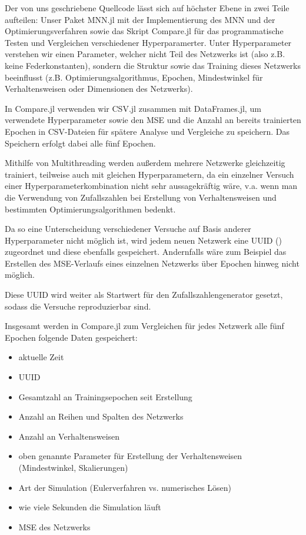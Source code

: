Der von uns geschriebene Quellcode lässt sich auf höchster Ebene in zwei Teile aufteilen: Unser Paket MNN.jl mit der Implementierung des MNN und der Optimierungsverfahren sowie das Skript Compare.jl für das programmatische Testen und Vergleichen verschiedener Hyperparamerter.
Unter Hyperparameter verstehen wir einen Parameter, welcher nicht Teil des Netzwerks ist (also z.B. keine Federkonstanten), sondern die Struktur sowie das Training dieses Netzwerks beeinflusst (z.B. Optimierungsalgorithmus, Epochen, Mindestwinkel für Verhaltensweisen oder Dimensionen des Netzwerks). 

In Compare.jl verwenden wir CSV.jl zusammen mit DataFrames.jl, um verwendete Hyperparameter sowie den MSE und die Anzahl an bereits trainierten Epochen in CSV-Dateien für spätere Analyse und Vergleiche zu speichern. 
Das Speichern erfolgt dabei alle fünf Epochen.

Mithilfe von Multithreading werden außerdem mehrere Netzwerke gleichzeitig trainiert, teilweise auch mit gleichen Hyperparametern, da ein einzelner Versuch einer Hyperparameterkombination nicht sehr aussagekräftig wäre, v.a. wenn man die Verwendung von Zufallszahlen bei Erstellung von Verhaltensweisen und bestimmten Optimierungsalgorithmen bedenkt.

Da so eine Unterscheidung verschiedener Versuche auf Basis anderer Hyperparameter nicht möglich ist, wird jedem neuen Netzwerk eine UUID ()
zugeordnet und diese ebenfalls gespeichert.
Andernfalls wäre zum Beispiel das Erstellen des MSE-Verlaufs eines einzelnen Netzwerks über Epochen hinweg nicht möglich.

Diese UUID wird weiter als Startwert für den Zufallszahlengenerator gesetzt, sodass die Versuche reproduzierbar sind.

Insgesamt werden in Compare.jl zum Vergleichen für jedes Netzwerk alle fünf Epochen folgende Daten gespeichert:

\begin{itemize}
    \item aktuelle Zeit
    \item UUID
    \item Gesamtzahl an Trainingsepochen seit Erstellung
    \item Anzahl an Reihen und Spalten des Netzwerks
    \item Anzahl an Verhaltensweisen
    \item oben genannte Parameter für Erstellung der Verhaltensweisen (Mindestwinkel, Skalierungen)
    \item Art der Simulation (Eulerverfahren vs. numerisches Lösen) %
    \item wie viele Sekunden die Simulation läuft
    \item MSE des Netzwerks
\end{itemize}

